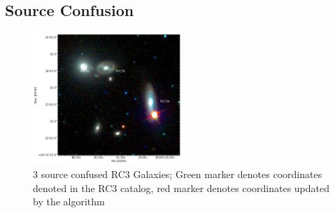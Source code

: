 \documentclass[5p]{elsarticle}
\begin{document}
	\subsection{Source Confusion}
		\begin{figure}[h]
		\includegraphics[width=0.5\textwidth]{figures/navigator}
		\caption{3 source confused RC3 Galaxies; Green marker denotes coordinates denoted in the RC3 catalog, red marker denotes coordinates updated by the algorithm}
	\end{figure}
\end{document}
